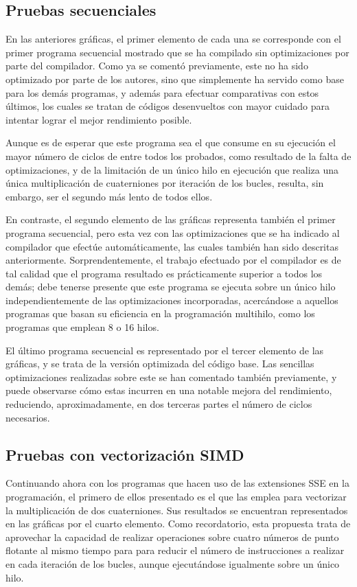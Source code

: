 \documentclass[conference]{IEEEtran}
\begin{document}
\subsection{Pruebas secuenciales}
En las anteriores gráficas, el primer elemento de cada una se corresponde con el primer programa secuencial mostrado que se ha compilado sin optimizaciones por parte del compilador. Como ya se comentó previamente, este no ha sido optimizado por parte de los autores, sino que simplemente ha servido como base para los demás programas, y además para efectuar comparativas con estos últimos, los cuales se tratan de códigos desenvueltos con mayor cuidado para intentar lograr el mejor rendimiento posible.

Aunque es de esperar que este programa sea el que consume en su ejecución el mayor número de ciclos de entre todos los probados, como resultado de la falta de optimizaciones, y de la limitación de un único hilo en ejecución que realiza una única multiplicación de cuaterniones por iteración de los bucles, resulta, sin embargo, ser el segundo más lento de todos ellos. 

En contraste, el segundo elemento de las gráficas representa también el primer programa secuencial, pero esta vez con las optimizaciones que se ha indicado al compilador que efectúe automáticamente, las cuales también han sido descritas anteriormente. Sorprendentemente, el trabajo efectuado por el compilador es de tal calidad que el programa resultado es prácticamente superior a todos los demás; debe tenerse presente que este programa se ejecuta sobre un único hilo independientemente de las optimizaciones incorporadas, acercándose a aquellos programas que basan su eficiencia en la programación multihilo, como los programas que emplean 8 o 16 hilos.

El último programa secuencial es representado por el tercer elemento de las gráficas, y se trata de la versión optimizada del código base. Las sencillas optimizaciones realizadas sobre este se han comentado también previamente, y puede observarse cómo estas incurren en una notable mejora del rendimiento, reduciendo, aproximadamente, en dos terceras partes el número de ciclos necesarios.

\subsection{Pruebas con vectorización SIMD}

Continuando ahora con los programas que hacen uso de las extensiones SSE en la programación, el primero de ellos presentado es el que las emplea para vectorizar la multiplicación de dos cuaterniones. Sus resultados se encuentran representados en las gráficas por el cuarto elemento. Como recordatorio, esta propuesta trata de aprovechar la capacidad de realizar operaciones sobre cuatro números de punto flotante al mismo tiempo para para reducir el número de instrucciones a realizar en cada iteración de los bucles, aunque ejecutándose igualmente sobre un único hilo.
\end{document}
